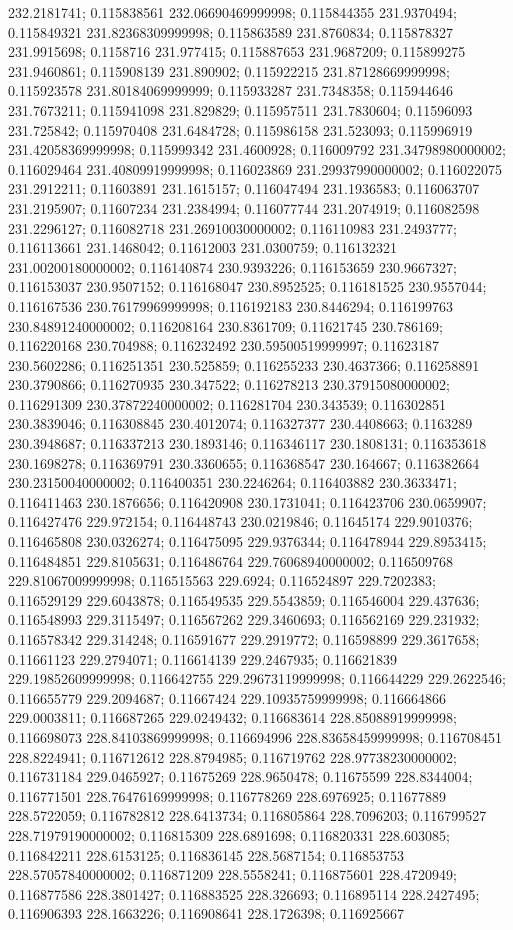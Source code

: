 232.2181741; 0.115838561 232.06690469999998; 0.115844355 231.9370494; 0.115849321 231.82368309999998; 0.115863589 231.8760834; 0.115878327 231.9915698; 0.1158716 231.977415; 0.115887653 231.9687209; 0.115899275 231.9460861; 0.115908139 231.890902; 0.115922215 231.87128669999998; 0.115923578 231.80184069999999; 0.115933287 231.7348358; 0.115944646 231.7673211; 0.115941098 231.829829; 0.115957511 231.7830604; 0.11596093 231.725842; 0.115970408 231.6484728; 0.115986158 231.523093; 0.115996919 231.42058369999998; 0.115999342 231.4600928; 0.116009792 231.34798980000002; 0.116029464 231.40809919999998; 0.116023869 231.29937990000002; 0.116022075 231.2912211; 0.11603891 231.1615157; 0.116047494 231.1936583; 0.116063707 231.2195907; 0.11607234 231.2384994; 0.116077744 231.2074919; 0.116082598 231.2296127; 0.116082718 231.26910030000002; 0.116110983 231.2493777; 0.116113661 231.1468042; 0.11612003 231.0300759; 0.116132321 231.00200180000002; 0.116140874 230.9393226; 0.116153659 230.9667327; 0.116153037 230.9507152; 0.116168047 230.8952525; 0.116181525 230.9557044; 0.116167536 230.76179969999998; 0.116192183 230.8446294; 0.116199763 230.84891240000002; 0.116208164 230.8361709; 0.11621745 230.786169; 0.116220168 230.704988; 0.116232492 230.59500519999997; 0.11623187 230.5602286; 0.116251351 230.525859; 0.116255233 230.4637366; 0.116258891 230.3790866; 0.116270935 230.347522; 0.116278213 230.37915080000002; 0.116291309 230.37872240000002; 0.116281704 230.343539; 0.116302851 230.3839046; 0.116308845 230.4012074; 0.116327377 230.4408663; 0.1163289 230.3948687; 0.116337213 230.1893146; 0.116346117 230.1808131; 0.116353618 230.1698278; 0.116369791 230.3360655; 0.116368547 230.164667; 0.116382664 230.23150040000002; 0.116400351 230.2246264; 0.116403882 230.3633471; 0.116411463 230.1876656; 0.116420908 230.1731041; 0.116423706 230.0659907; 0.116427476 229.972154; 0.116448743 230.0219846; 0.11645174 229.9010376; 0.116465808 230.0326274; 0.116475095 229.9376344; 0.116478944 229.8953415; 0.116484851 229.8105631; 0.116486764 229.76068940000002; 0.116509768 229.81067009999998; 0.116515563 229.6924; 0.116524897 229.7202383; 0.116529129 229.6043878; 0.116549535 229.5543859; 0.116546004 229.437636; 0.116548993 229.3115497; 0.116567262 229.3460693; 0.116562169 229.231932; 0.116578342 229.314248; 0.116591677 229.2919772; 0.116598899 229.3617658; 0.11661123 229.2794071; 0.116614139 229.2467935; 0.116621839 229.19852609999998; 0.116642755 229.29673119999998; 0.116644229 229.2622546; 0.116655779 229.2094687; 0.11667424 229.10935759999998; 0.116664866 229.0003811; 0.116687265 229.0249432; 0.116683614 228.85088919999998; 0.116698073 228.84103869999998; 0.116694996 228.83658459999998; 0.116708451 228.8224941; 0.116712612 228.8794985; 0.116719762 228.97738230000002; 0.116731184 229.0465927; 0.11675269 228.9650478; 0.11675599 228.8344004; 0.116771501 228.76476169999998; 0.116778269 228.6976925; 0.11677889 228.5722059; 0.116782812 228.6413734; 0.116805864 228.7096203; 0.116799527 228.71979190000002; 0.116815309 228.6891698; 0.116820331 228.603085; 0.116842211 228.6153125; 0.116836145 228.5687154; 0.116853753 228.57057840000002; 0.116871209 228.5558241; 0.116875601 228.4720949; 0.116877586 228.3801427; 0.116883525 228.326693; 0.116895114 228.2427495; 0.116906393 228.1663226; 0.116908641 228.1726398; 0.116925667 